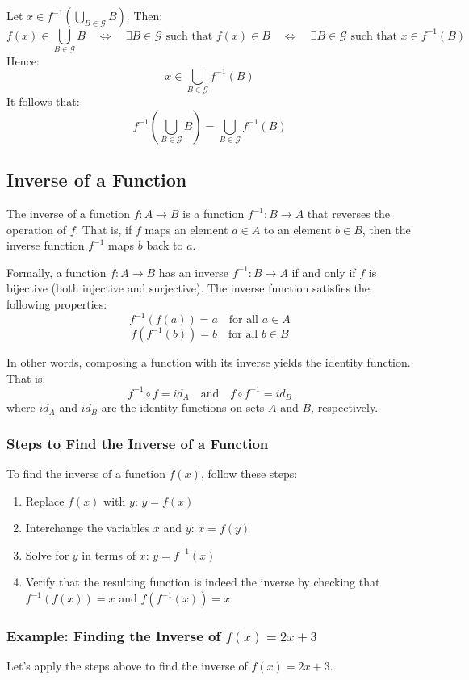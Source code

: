 Let \( x \in f^{-1} \left( \bigcup_{B \in \mathcal{G}} B \right) \). Then:
\[
	f(x) \in \bigcup_{B \in \mathcal{G}} B
	\quad \Leftrightarrow \quad
	\exists B \in \mathcal{G} \text{ such that } f(x) \in B
	\quad \Leftrightarrow \quad
	\exists B \in \mathcal{G} \text{ such that } x \in f^{-1}(B)
\]
Hence:
\[
	x \in \bigcup_{B \in \mathcal{G}} f^{-1}(B)
\]
It follows that:
\[
	f^{-1} \left( \bigcup_{B \in \mathcal{G}} B \right) = \bigcup_{B \in \mathcal{G}} f^{-1}(B)
\]


\subsection{Inverse of a Function}
The inverse of a function \(f: A \to B\) is a function \(f^{-1}: B \rightarrow A\) that reverses the operation of \(f\). That is, if \(f\) maps an element \(a \in A\) to an element \(b \in B\), then the inverse function \(f^{-1}\) maps \(b\) back to \(a\).

 Formally, a function \(f: A \to B\) has an inverse \(f^{-1}: B \rightarrow A\) if and only if \(f\) is bijective (both injective and surjective). The inverse function satisfies the following properties:
\[
	f^{-1}(f(a)) = a \quad \text{for all } a \in A
\]
\[
	f(f^{-1}(b)) = b \quad \text{for all } b \in B
\]

In other words, composing a function with its inverse yields the identity function. That is:
\[
	f^{-1} \circ f = id_A \quad \text{and} \quad f \circ f^{-1} = id_B
\]
where \(id_A\) and \(id_B\) are the identity functions on sets \(A\) and \(B\), respectively.

\subsubsection{Steps to Find the Inverse of a Function}
To find the inverse of a function \(f (x)\), follow these steps:
\begin{enumerate}
	\item Replace \(f (x)\) with \(y\): \(y = f (x)\)
	\item Interchange the variables \(x\) and \(y\): \(x = f (y)\)
	\item Solve for \(y\) in terms of \(x\): \(y = f^{-1} (x)\)
	\item Verify that the resulting function is indeed the inverse by checking that \(f^{-1}(f(x)) = x\) and \(f (f^{-1} (x)) = x\)
\end{enumerate}

\subsubsection{Example: Finding the Inverse of \texorpdfstring{\(f (x) = 2x + 3\)}{}}
Let's apply the steps above to find the inverse of \(f (x) = 2x + 3\).

